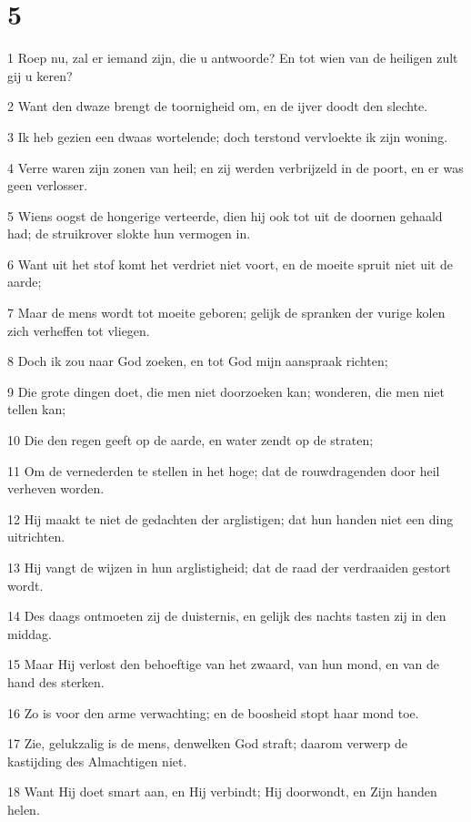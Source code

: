 \chapter{5}

\par 1 Roep nu, zal er iemand zijn, die u antwoorde? En tot wien van de heiligen zult gij u keren?
\par 2 Want den dwaze brengt de toornigheid om, en de ijver doodt den slechte.
\par 3 Ik heb gezien een dwaas wortelende; doch terstond vervloekte ik zijn woning.
\par 4 Verre waren zijn zonen van heil; en zij werden verbrijzeld in de poort, en er was geen verlosser.
\par 5 Wiens oogst de hongerige verteerde, dien hij ook tot uit de doornen gehaald had; de struikrover slokte hun vermogen in.
\par 6 Want uit het stof komt het verdriet niet voort, en de moeite spruit niet uit de aarde;
\par 7 Maar de mens wordt tot moeite geboren; gelijk de spranken der vurige kolen zich verheffen tot vliegen.
\par 8 Doch ik zou naar God zoeken, en tot God mijn aanspraak richten;
\par 9 Die grote dingen doet, die men niet doorzoeken kan; wonderen, die men niet tellen kan;
\par 10 Die den regen geeft op de aarde, en water zendt op de straten;
\par 11 Om de vernederden te stellen in het hoge; dat de rouwdragenden door heil verheven worden.
\par 12 Hij maakt te niet de gedachten der arglistigen; dat hun handen niet een ding uitrichten.
\par 13 Hij vangt de wijzen in hun arglistigheid; dat de raad der verdraaiden gestort wordt.
\par 14 Des daags ontmoeten zij de duisternis, en gelijk des nachts tasten zij in den middag.
\par 15 Maar Hij verlost den behoeftige van het zwaard, van hun mond, en van de hand des sterken.
\par 16 Zo is voor den arme verwachting; en de boosheid stopt haar mond toe.
\par 17 Zie, gelukzalig is de mens, denwelken God straft; daarom verwerp de kastijding des Almachtigen niet.
\par 18 Want Hij doet smart aan, en Hij verbindt; Hij doorwondt, en Zijn handen helen.
